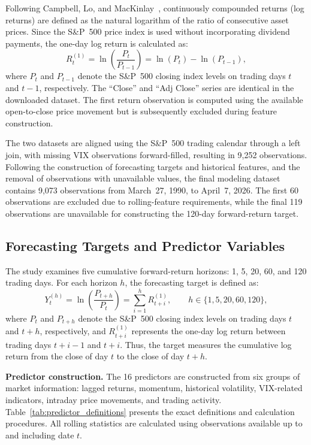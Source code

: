 \documentclass[12pt,twoside]{ord}
\begin{document}
Following Campbell, Lo, and MacKinlay~\cite{campbell1998}, continuously compounded returns (log returns) are defined as the natural logarithm of the ratio of consecutive asset prices. Since the S\&P~500 price index is used without incorporating dividend payments, the one-day log return is calculated as:
\begin{equation}\label{eq:daily_log_return}
R_t^{(1)} = \ln\left(\frac{P_t}{P_{t-1}}\right) = \ln(P_t) - \ln(P_{t-1}),
\end{equation}
where $P_t$ and $P_{t-1}$ denote the S\&P~500 closing index levels on trading days $t$ and $t-1$, respectively. The ``Close'' and ``Adj Close'' series are identical in the downloaded dataset. The first return observation is computed using the available open-to-close price movement but is subsequently excluded during feature construction.

The two datasets are aligned using the S\&P~500 trading calendar through a left join, with missing VIX observations forward-filled, resulting in 9,252 observations. Following the construction of forecasting targets and historical features, and the removal of observations with unavailable values, the final modeling dataset contains 9,073 observations from March~27, 1990, to April~7, 2026. The first 60 observations are excluded due to rolling-feature requirements, while the final 119 observations are unavailable for constructing the 120-day forward-return target.

\subsection{Forecasting Targets and Predictor Variables}\label{subsec:targets_predictors}

The study examines five cumulative forward-return horizons: 1, 5, 20, 60, and 120 trading days. For each horizon $h$, the forecasting target is defined as:
\begin{equation}\label{eq:target_return}
Y_t^{(h)} = \ln\left(\frac{P_{t+h}}{P_t}\right) = \sum_{i=1}^h R_{t+i}^{(1)}, \qquad h \in \{1, 5, 20, 60, 120\},
\end{equation}
where $P_t$ and $P_{t+h}$ denote the S\&P~500 closing index levels on trading days $t$ and $t+h$, respectively, and $R_{t+i}^{(1)}$ represents the one-day log return between trading days $t+i-1$ and $t+i$. Thus, the target measures the cumulative log return from the close of day $t$ to the close of day $t+h$.

\noindent\textbf{Predictor construction.} The 16 predictors are constructed from six groups of market information: lagged returns, momentum, historical volatility, VIX-related indicators, intraday price movements, and trading activity. Table~\ref{tab:predictor_definitions} presents the exact definitions and calculation procedures. All rolling statistics are calculated using observations available up to and including date $t$.
\end{document}
